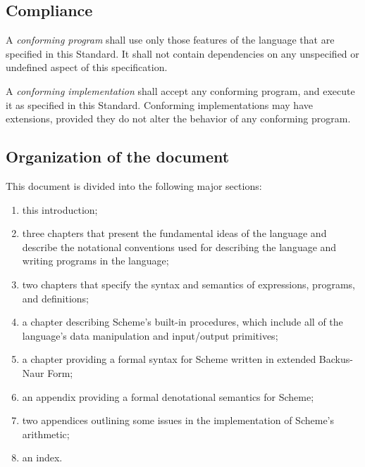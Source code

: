 \subsection*{Compliance}

\vest A {\it conforming program\/} shall use only those features of
the language that are specified in this Standard.  It shall not
contain dependencies on any unspecified or undefined aspect of this
specification.

\vest A {\it conforming implementation\/} shall accept any conforming
program, and execute it as specified in this Standard.  Conforming
implementations may have extensions, provided they do not alter the
behavior of any conforming program.


\subsection*{Organization of the document}

\vest This document is divided into the following major sections:

\begin{enumerate}

\item this introduction;

\item three chapters that present the fundamental ideas of the
language and describe the notational conventions used for describing
the language and writing programs in the language;

\item two chapters that specify the syntax and semantics of
expressions, programs, and definitions;

\item a chapter describing Scheme's built-in procedures, which include
all of the language's data manipulation and input/output primitives;

\item a chapter providing a formal syntax for Scheme written in
extended Backus-Naur Form;

\item an appendix providing a formal denotational semantics for
Scheme;

\item two appendices outlining some issues in the implementation of
Scheme's arithmetic;

\item an index.

\end{enumerate}


